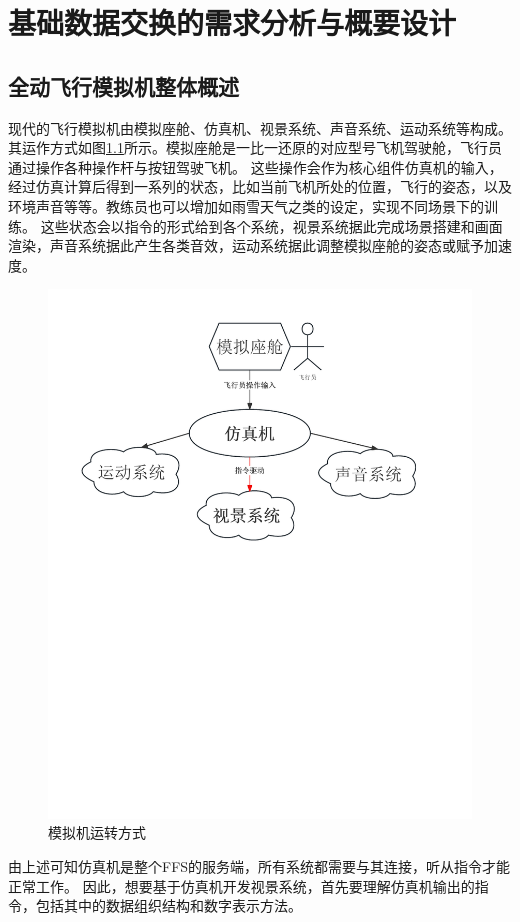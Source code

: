 \chapter{基础数据交换的需求分析与概要设计}
\section{全动飞行模拟机整体概述}
现代的飞行模拟机由模拟座舱、仿真机、视景系统、声音系统、运动系统等构成。其运作方式如图\ref{simstruct}所示。模拟座舱是一比一还原的对应型号飞机驾驶舱，飞行员通过操作各种操作杆与按钮驾驶飞机。
这些操作会作为核心组件仿真机的输入，经过仿真计算后得到一系列的状态，比如当前飞机所处的位置，飞行的姿态，以及环境声音等等。教练员也可以增加如雨雪天气之类的设定，实现不同场景下的训练。
这些状态会以指令的形式给到各个系统，视景系统据此完成场景搭建和画面渲染，声音系统据此产生各类音效，运动系统据此调整模拟座舱的姿态或赋予加速度。
\begin{figure}[h]
    \begin{center}
        \includegraphics[width=.9\textwidth]{pictures/simstruct.pdf}
        \caption{模拟机运转方式}
        \label{simstruct}
    \end{center}
\end{figure}
\par
由上述可知仿真机是整个FFS的服务端，所有系统都需要与其连接，听从指令才能正常工作。
因此，想要基于仿真机开发视景系统，首先要理解仿真机输出的指令，包括其中的数据组织结构和数字表示方法。
